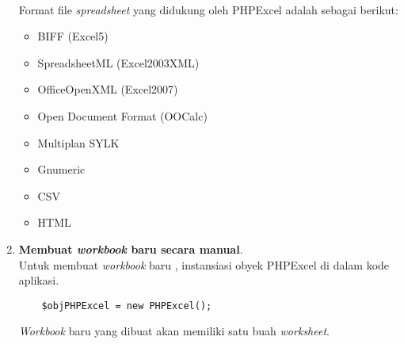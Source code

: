 \begin{enumerate}
\paragraph{} Format file \textit{spreadsheet} yang didukung oleh PHPExcel adalah sebagai berikut:
\begin{itemize}
	\item BIFF (Excel5)
	\item SpreadsheetML (Excel2003XML)
	\item OfficeOpenXML (Excel2007)
	\item Open Document Format (OOCalc)
	\item Multiplan SYLK
	\item Gnumeric
	\item CSV
	\item HTML
\end{itemize}
	\item \textbf{Membuat \textit{workbook} baru secara manual}.\\
Untuk membuat \textit{workbook} baru , instansiasi obyek PHPExcel di dalam kode aplikasi.
	\begin{lstlisting}
	$objPHPExcel = new PHPExcel();
	\end{lstlisting}
\textit{Workbook} baru yang dibuat akan memiliki satu buah \textit{worksheet}.
\end{enumerate}

